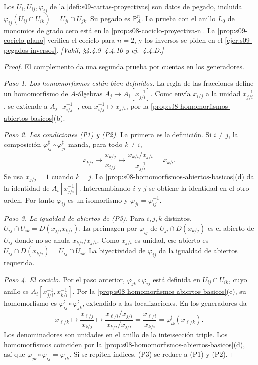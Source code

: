 \begin{prop}
\label{prop:s09-pegado-proyectivo}
Los $U_i,U_{ij},\varphi_{ij}$ de la \cref{defi:s09-cartas-proyectivas} son datos de pegado, incluida $\varphi_{ij}(U_{ij}\cap U_{ik})=U_{ji}\cap U_{jk}$. Su pegado es $\mathbb P^n_A$. La prueba con el anillo $L_0$ de monomios de grado cero está en la \cref{prop:s08-cociclo-proyectiva-n}. La \cref{prop:s09-cociclo-plano} verifica el cociclo para $n=2$, y los inversos se piden en el \cref{ejer:s09-pegados-inversos}. \emph{[Vakil, \S4.4.9--4.4.10 y ej.~4.4.D.]}
\end{prop}
\begin{proof}
El complemento da una segunda prueba por cuentas en los generadores.

\emph{Paso 1. Los homomorfismos están bien definidos.} La regla de las fracciones define un homomorfismo de $A$-álgebras $A_j\to A_i[x_{j/i}^{-1}]$. Como envía $x_{i/j}$ a la unidad $x_{j/i}^{-1}$, se extiende a $A_j[x_{i/j}^{-1}]$, con $x_{i/j}^{-1}\mapsto x_{j/i}$, por la \cref{prop:s08-homomorfismos-abiertos-basicos}(b).

\emph{Paso 2. Las condiciones (P1) y (P2).} La primera es la definición. Si $i\ne j$, la composición $\varphi_{ij}^\sharp\circ\varphi_{ji}^\sharp$ manda, para todo $k\ne i$,
\[
x_{k/i}\longmapsto\frac{x_{k/j}}{x_{i/j}}
\longmapsto\frac{x_{k/i}/x_{j/i}}{x_{j/i}^{-1}}
=x_{k/i}.
\]
Se usa $x_{j/j}=1$ cuando $k=j$. La \cref{prop:s08-homomorfismos-abiertos-basicos}(d) da la identidad de $A_i[x_{j/i}^{-1}]$. Intercambiando $i$ y $j$ se obtiene la identidad en el otro orden. Por tanto $\varphi_{ij}$ es un isomorfismo y $\varphi_{ji}=\varphi_{ij}^{-1}$.

\emph{Paso 3. La igualdad de abiertos de (P3).} Para $i,j,k$ distintos, $U_{ij}\cap U_{ik}=D(x_{j/i}x_{k/i})$. La preimagen por $\varphi_{ij}$ de $U_{ji}\cap D(x_{k/j})$ es el abierto de $U_{ij}$ donde no se anula $x_{k/i}/x_{j/i}$. Como $x_{j/i}$ es unidad, ese abierto es $U_{ij}\cap D(x_{k/i})=U_{ij}\cap U_{ik}$. La biyectividad de $\varphi_{ij}$ da la igualdad de abiertos requerida.

\emph{Paso 4. El cociclo.} Por el paso anterior, $\varphi_{jk}\circ\varphi_{ij}$ está definida en $U_{ij}\cap U_{ik}$, cuyo anillo es $A_i[x_{j/i}^{-1},x_{k/i}^{-1}]$. Por la \cref{prop:s08-homomorfismos-abiertos-basicos}(e), su homomorfismo es $\varphi_{ij}^\sharp\circ\varphi_{jk}^\sharp$, extendido a las localizaciones. En los generadores da
\[
x_{\ell/k}\longmapsto\frac{x_{\ell/j}}{x_{k/j}}
\longmapsto
\frac{x_{\ell/i}/x_{j/i}}{x_{k/i}/x_{j/i}}
=\frac{x_{\ell/i}}{x_{k/i}}
=\varphi_{ik}^\sharp(x_{\ell/k}).
\]
Los denominadores son unidades en el anillo de la intersección triple. Los homomorfismos coinciden por la \cref{prop:s08-homomorfismos-abiertos-basicos}(d), así que $\varphi_{jk}\circ\varphi_{ij}=\varphi_{ik}$. Si se repiten índices, (P3) se reduce a (P1) y (P2).
\end{proof}


